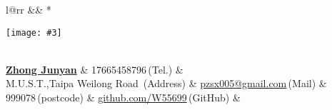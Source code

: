 \newcommand{\paint}[3]{
    \begin{minipage}{#1}
        \texttt{[image: \#3]}
    \end{minipage}
}
\newcommand{\myheader}{
\begin{tabular*}{\textwidth}{l@{\extracolsep{\fill}}rr}
  && \multirow{4}*{\paint{2.6cm}{3.2cm}{./image.jpg}}\\
  \specialrule{0em}{3pt}{3pt}
  \textbf{\href{http://herechen.github.io}{\LARGE Zhong Junyan}} & 17665458796$\,${\color{labelgrey}(Tel.)} &\\
M.U.S.T.,Taipa Weilong Road $\,${\color{labelgrey}(Address)} & \href{mailto:pzsx005@gmail.com}{pzsx005@gmail.com}$\,${\color{labelgrey}(Mail)} & \\
  999078$\,${\color{labelgrey}(postcode)} & \href{https://github.com/W55699}{github.com/W55699}$\,${\color{labelgrey}(GitHub)} & \\
  \end{tabular*}\\\vspace{0.1in}
}

\myheader

